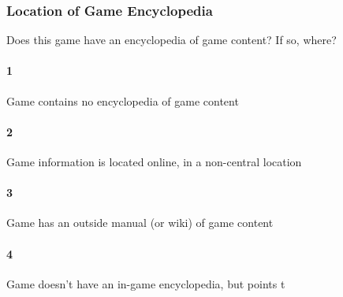 \subsubsection{Location of Game Encyclopedia}Does this game have an encyclopedia of game content? If so, where?\paragraph{1}Game contains no encyclopedia of game content\paragraph{2}Game information is located online, in a non-central location\paragraph{3}Game has an outside manual (or wiki) of game content\paragraph{4}Game doesn't have an in-game encyclopedia, but points t
